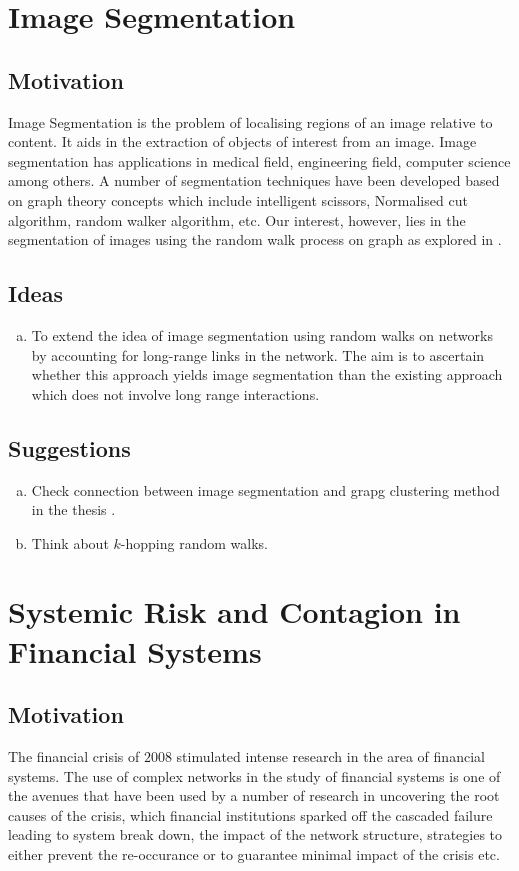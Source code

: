 \documentclass[10pt,a4paper]{article}
\begin{document}
    
    \section{Image Segmentation}
    \subsection{Motivation}
    Image Segmentation is the problem of localising regions of an image relative to content. It aids in the extraction of objects of interest from an image. Image segmentation has applications in medical field, engineering field, computer science among others. A number of segmentation techniques have been developed based on graph theory concepts which include intelligent scissors, Normalised cut algorithm, random walker algorithm, etc. Our interest, however, lies in the segmentation of images using the random walk process on graph as explored in \citep{grady2006random}.
    \subsection{Ideas}
    \begin{enumerate}[a)]
    	\item To extend the idea of image segmentation using random walks on networks by accounting for long-range links in the network. The aim is to ascertain whether this approach yields image segmentation than the existing approach which does not involve long range interactions.
    \end{enumerate}

     \subsection{Suggestions}   
     \begin{enumerate}[a)]
     	\item  Check connection between image segmentation and grapg clustering method in the thesis \citep{xiao2009graph}.
     	\item Think about $k$-hopping random walks.
     \end{enumerate}

    \section{Systemic Risk and Contagion in Financial Systems}
    \subsection{Motivation}
    The financial crisis of $2008$ stimulated intense research in the area of financial systems. The use of complex networks in the study of financial systems is one of the avenues that have been used by a number of research in uncovering the root causes of the crisis, which financial institutions sparked off the cascaded failure leading to system break down, the impact of the network structure, strategies to  either prevent the re-occurance or to guarantee minimal impact of the crisis etc. 
\end{document}
